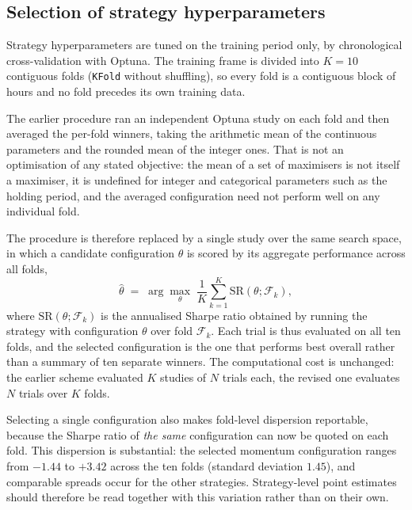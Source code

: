
\subsection{Selection of strategy hyperparameters}
\label{sec:strategy_hparam_selection_revised}

Strategy hyperparameters are tuned on the training period only, by chronological
cross-validation with Optuna. The training frame is divided into $K = 10$
contiguous folds (\texttt{KFold} without shuffling), so every fold is a
contiguous block of hours and no fold precedes its own training data.

The earlier procedure ran an independent Optuna study on each fold and then
averaged the per-fold winners, taking the arithmetic mean of the continuous
parameters and the rounded mean of the integer ones. That is not an optimisation
of any stated objective: the mean of a set of maximisers is not itself a
maximiser, it is undefined for integer and categorical parameters such as the
holding period, and the averaged configuration need not perform well on any
individual fold.

The procedure is therefore replaced by a single study over the same search space,
in which a candidate configuration $\theta$ is scored by its aggregate performance
across all folds,
%
\begin{equation}
\hat{\theta} \;=\; \arg\max_{\theta}\; \frac{1}{K}\sum_{k=1}^{K}
\mathrm{SR}\!\left(\theta; \mathcal{F}_k\right),
\label{eq:strategy_objective}
\end{equation}
%
where $\mathrm{SR}(\theta; \mathcal{F}_k)$ is the annualised Sharpe ratio obtained
by running the strategy with configuration $\theta$ over fold $\mathcal{F}_k$.
Each trial is thus evaluated on all ten folds, and the selected configuration is
the one that performs best overall rather than a summary of ten separate winners.
The computational cost is unchanged: the earlier scheme evaluated $K$ studies of
$N$ trials each, the revised one evaluates $N$ trials over $K$ folds.

Selecting a single configuration also makes fold-level dispersion reportable,
because the Sharpe ratio of \emph{the same} configuration can now be quoted on
each fold. This dispersion is substantial: the selected momentum configuration
ranges from $-1.44$ to $+3.42$ across the ten folds (standard deviation $1.45$),
and comparable spreads occur for the other strategies. Strategy-level point
estimates should therefore be read together with this variation rather than on
their own.

